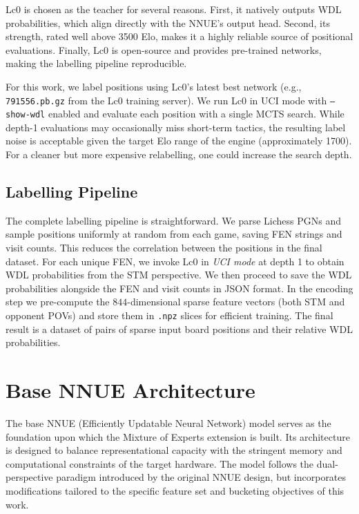 Lc0 is chosen as the teacher for several reasons. First, it natively outputs WDL probabilities, which align directly with the NNUE's output head. Second, its strength, rated well above 3500 Elo, makes it a highly reliable source of positional evaluations. Finally, Lc0 is open-source and provides pre-trained networks, making the labelling pipeline reproducible.

For this work, we label positions using Lc0's latest best network (e.g., \texttt{791556.pb.gz} from the Lc0 training server). We run Lc0 in UCI mode with \texttt{--show-wdl} enabled and evaluate each position with a single MCTS search. While depth-1 evaluations may occasionally miss short-term tactics, the resulting label noise is acceptable given the target Elo range of the engine (approximately 1700). For a cleaner but more expensive relabelling, one could increase the search depth.

\subsection{Labelling Pipeline}\label{sec:labelling-pipeline}

The complete labelling pipeline is straightforward. We parse Lichess PGNs and sample positions uniformly at random from each game, saving FEN strings and visit counts. This reduces the correlation between the positions in the final dataset. For each unique FEN, we invoke Lc0 in \emph{UCI mode} at depth 1 to obtain WDL probabilities from the STM perspective. We then proceed to save the WDL probabilities alongside the FEN and visit counts in JSON format. In the encoding step we pre-compute the \(844\)-dimensional sparse feature vectors (both STM and opponent POVs) and store them in \texttt{.npz} slices for efficient training. The final result is a dataset of pairs of sparse input board positions and their relative WDL probabilities.

\section{Base NNUE Architecture}\label{sec:base-nnue}

The base NNUE (Efficiently Updatable Neural Network) model serves as the foundation upon which the Mixture of Experts extension is built. Its architecture is designed to balance representational capacity with the stringent memory and computational constraints of the target hardware. The model follows the dual-perspective paradigm introduced by the original NNUE design, but incorporates modifications tailored to the specific feature set and bucketing objectives of this work.

